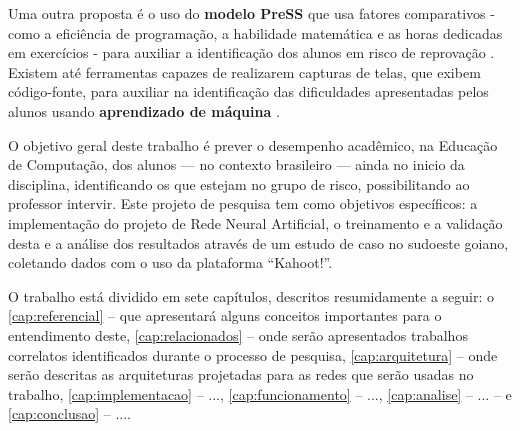  Uma outra proposta é o uso do \textbf{modelo PreSS} que usa fatores comparativos - como a eficiência de programação, a habilidade matemática  e as horas dedicadas em exercícios - para auxiliar a identificação dos alunos em risco de reprovação \cite{quille2018}. Existem até ferramentas capazes de realizarem capturas de telas, que exibem código-fonte, para auxiliar na identificação das dificuldades apresentadas pelos alunos usando \textbf{aprendizado de máquina} \cite{ahadi2016early}.
 
O objetivo geral deste trabalho é prever o desempenho acadêmico, na Educação de Computação, dos alunos --- no contexto brasileiro --- ainda no inicio da disciplina, identificando os que estejam no grupo de risco, possibilitando ao professor intervir. Este projeto de pesquisa tem como objetivos específicos: a implementação do projeto de Rede Neural Artificial, o treinamento e a validação desta e a análise dos resultados através de um estudo de caso no sudoeste goiano, coletando dados com o uso da plataforma ``Kahoot!''.




O trabalho está dividido em sete capítulos, descritos resumidamente a seguir: o \autoref{cap:referencial} -- que apresentará alguns conceitos importantes para o entendimento deste, \autoref{cap:relacionados} -- onde serão apresentados trabalhos correlatos identificados durante o processo de pesquisa, \autoref{cap:arquitetura} -- onde serão descritas as arquiteturas projetadas para as redes que serão usadas no trabalho, \autoref{cap:implementacao} -- ..., \autoref{cap:funcionamento} -- ..., \autoref{cap:analise} -- ... -- e \autoref{cap:conclusao} -- ....

